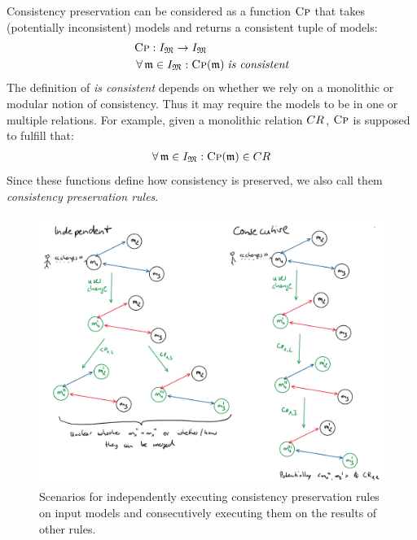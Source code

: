 Consistency preservation can be considered as a function $\textsc{Cp}$ that takes (potentially inconsistent) models and returns a consistent tuple of models:
\begin{align*}
    & \function{Cp} : \metamodeltupleinstanceset{M} \rightarrow \metamodeltupleinstanceset{M}\\
    & \forall \modeltuple{m} \in \metamodeltupleinstanceset{M} : \function{Cp}(\modeltuple{m}) \mathtextspacebefore{is consistent}
\end{align*}
The definition of \emph{is consistent} depends on whether we rely on a monolithic or modular notion of consistency.
Thus it may require the models to be in one or multiple relations.
For example, given a monolithic relation $\consistencyrelation{CR}{}$, $\textsc{Cp}$ is supposed to fulfill that: 
\begin{align*}
    \forall \modeltuple{m} \in \metamodeltupleinstanceset{M} : \function{Cp}(\modeltuple{m}) \in \consistencyrelation{CR}{}
\end{align*}
Since these functions define how consistency is preserved, we also call them \emph{consistency preservation rules}.

\begin{figure}
    \centering
    \includegraphics[width=\textwidth]{figures/correctness/notion/concurrent_consecutive_execution.png}
    \caption[Execution alternatives of consistency preservation rules]{Scenarios for independently executing consistency preservation rules on input models and consecutively executing them on the results of other rules.}
    \label{fig:correctness:concurrent_consecutive_execution}
\end{figure}

